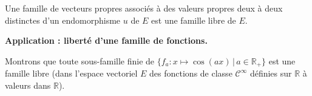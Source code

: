\documentclass[french,11pt,twoside]{VcCours}
\begin{document}
\begin{Corollaire}{} Une famille de vecteurs propres associés à des valeurs propres 
	deux à deux distinctes d'un endomorphisme $u$ de $E$ est une famille libre de $E$. 
\end{Corollaire}

\begin{Demonstration}{} 

\vspace{5cm}
\end{Demonstration}

%
%

\textbf{Application : liberté d'une famille de fonctions.}

Montrons que toute sous-famille finie de $\lbrace f_a : x \mapsto \cos(ax) \, \vert \, a \in \mathbb{R}_+\rbrace$ est une famille libre (dans l'espace vectoriel $E$ des fonctions de classe $\mathcal{C}^{\infty}$ définies  sur $\mathbb{R}$ à valeurs dans $\mathbb{R}$).

%
\end{document}
